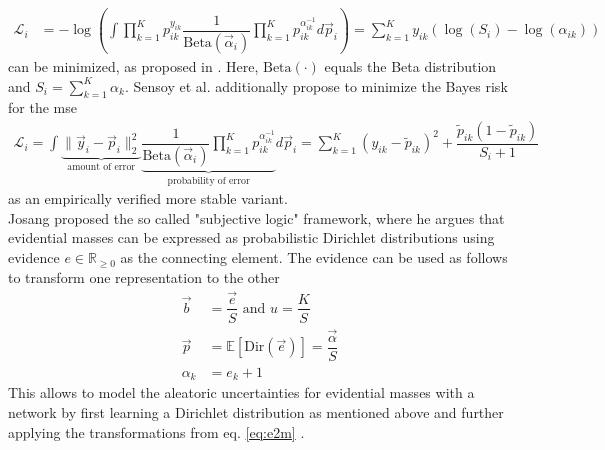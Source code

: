 \begin{align}
	\mathcal{L}_i &= -\log\left( \int\prod_{k=1}^{K}p_{ik}^{y_{ik}}\dfrac{1}{\mathrm{Beta}(\vec{\alpha}_i)}\prod_{k=1}^{K}p_{ik}^{\alpha_{ik}^{-1}}d\vec{p}_i \right)  = \sum_{k=1}^{K}y_{ik}(\log(S_i)-\log(\alpha_{ik}))	
\end{align}  
can be minimized, as proposed in \cite{wu2019quantifying,sensoy2018evidential}. Here, $\mathrm{Beta}(\cdot)$ equals the Beta distribution and $S_i = \sum_{k=1}^{K} \alpha_k$. Sensoy et al. \cite{sensoy2018evidential} additionally propose to minimize the Bayes risk for the \gls{mse}
\begin{align}
	\label{eq:bayes_risk_mse}
	\mathcal{L}_i = \int \underbrace{\| \vec{y}_i - \vec{p}_i\|^{2}_{2}}_{\text{amount of error}}\underbrace{\dfrac{1}{\mathrm{Beta}(\vec{\alpha}_i)}\prod_{k=1}^{K}p_{ik}^{\alpha_{ik}^{-1}}}_{\text{probability of error}}d\vec{p}_i = \sum_{k=1}^{K}(y_{ik}-\tilde{p}_{ik})^2 + \dfrac{\tilde{p}_{ik}(1-\tilde{p}_{ik})}{S_i+1}
\end{align} 
as an empirically verified more stable variant.\\
%
Josang \cite{audun2018subjective} proposed the so called "subjective logic" framework, where he argues that evidential masses can be expressed as probabilistic Dirichlet distributions using evidence $e \in \mathbb{R}_{\geq 0}$ as the connecting element. The evidence can be used as follows to transform one representation to the other
\begin{align}
	\label{eq:e2m}
	\vec{b} &= \dfrac{\vec{e}}{S} \text{ and } u = \dfrac{K}{S}\\
	\label{eq:e2p}
	\vec{p} &= \mathbb{E}[\mathrm{Dir}(\vec{e})] = \dfrac{\vec{\alpha}}{S}\\
	\alpha_k &= e_k + 1
\end{align} 
This allows to model the aleatoric uncertainties for evidential masses with a network by first learning a Dirichlet distribution as mentioned above and further applying the transformations from eq. \eqref{eq:e2m} \cite{sensoy2018evidential}. 
%
